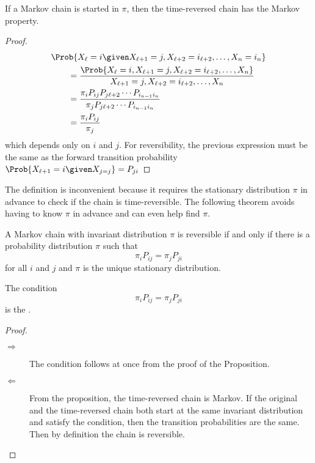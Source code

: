 \documentclass[12pt]{article}
\begin{document}
\begin{proposition}
    If a Markov chain is started in \( \pi \), then the time-reversed
    chain has the Markov property.
\end{proposition}

\begin{proof}
    \begin{align*}
        & \Prob{X_\ell = i \given X_{\ell+1} = j, X_{\ell+2} = i_{\ell+2},
        \dots, X_n = i_n} \\
        &\qquad = \frac{\Prob{X_\ell = i, X_{\ell+1} = j, X_{\ell+2} = i_
        {\ell+2}, \dots, X_n}}{X_{\ell+1} = j, X_{\ell+2} = i_{\ell+2},
        \dots, X_n} \\
        &\qquad = \frac{\pi_i P_{ij}P_{j \ell+2}\cdots P_{i_{n-1} i_n}}{\pi_j
        P_{j \ell+2}\cdots P_{i_{n-1} i_n}} \\
        &\qquad = \frac{\pi_i P_{ij}}{\pi_j}
    \end{align*}
    which depends only on \( i \) and \( j \). For reversibility, the
    previous expression must be the same as the forward transition
    probability \( \Prob{X_{\ell+1} = i \given X_{j = j}} = P_{ji} \)
\end{proof}

\begin{remark}
    The definition is inconvenient because it requires the stationary
    distribution \( \pi \) in advance to check if the chain is
    time-reversible.  The following theorem avoids having to know \( \pi
    \) in advance and can even help find \( \pi \).

\end{remark}
\begin{theorem}
    A Markov chain with invariant distribution \( \pi \) is reversible
    if and only if there is a probability distribution \( \pi \) such
    that
    \[
        \pi_i P_{ij} = \pi_j P_{ji}
    \] for all \( i \) and \( j \) and \( \pi \) is the unique
    stationary distribution.
\end{theorem}

\begin{remark}
    The condition
    \[
        \pi_i P_{ij} = \pi_j P_{ji}
    \] is the .%
\end{remark}

\begin{proof}
    \begin{description}
        \item[$\Rightarrow$]
            The condition follows at once from the proof of the
            Proposition.
        \item[$\Leftarrow$]
            From the proposition, the time-reversed chain is Markov.  If
            the original and the time-reversed chain both start at the
            same invariant distribution and satisfy the condition, then
            the transition probabilities are the same.  Then by
            definition the chain is reversible.
    \end{description}
\end{proof}
\end{document}
